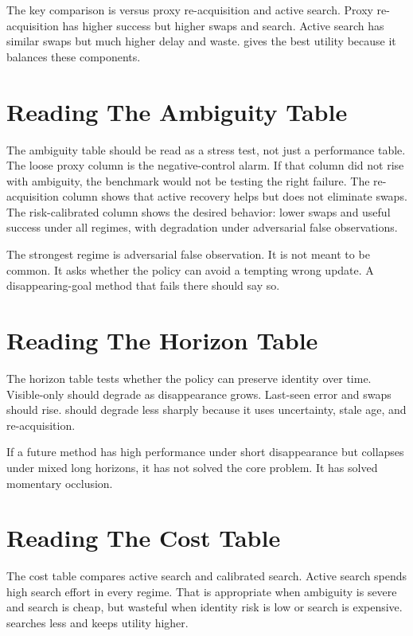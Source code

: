 The key comparison is \method versus proxy re-acquisition and active search. Proxy re-acquisition has higher success but higher swaps and search. Active search has similar swaps but much higher delay and waste. \method gives the best utility because it balances these components.

\section{Reading The Ambiguity Table}

The ambiguity table should be read as a stress test, not just a performance table. The loose proxy column is the negative-control alarm. If that column did not rise with ambiguity, the benchmark would not be testing the right failure. The re-acquisition column shows that active recovery helps but does not eliminate swaps. The risk-calibrated column shows the desired behavior: lower swaps and useful success under all regimes, with degradation under adversarial false observations.

The strongest regime is adversarial false observation. It is not meant to be common. It asks whether the policy can avoid a tempting wrong update. A disappearing-goal method that fails there should say so.

\section{Reading The Horizon Table}

The horizon table tests whether the policy can preserve identity over time. Visible-only should degrade as disappearance grows. Last-seen error and swaps should rise. \method should degrade less sharply because it uses uncertainty, stale age, and re-acquisition.

If a future method has high performance under short disappearance but collapses under mixed long horizons, it has not solved the core problem. It has solved momentary occlusion.

\section{Reading The Cost Table}

The cost table compares active search and calibrated search. Active search spends high search effort in every regime. That is appropriate when ambiguity is severe and search is cheap, but wasteful when identity risk is low or search is expensive. \method searches less and keeps utility higher.

